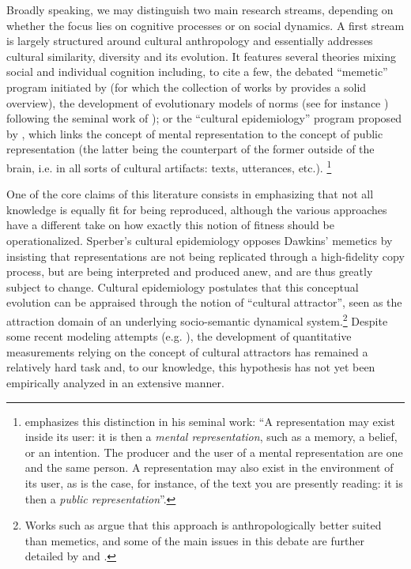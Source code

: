 Broadly speaking, we may distinguish two main research streams, depending on whether the focus lies on cognitive processes or on social dynamics. A first stream is largely structured around cultural anthropology and essentially addresses cultural similarity, diversity and its evolution. It features several theories mixing social and individual cognition including, to cite a few, the debated ``memetic'' program initiated by \citet{Dawkins76} (for which the collection of works by \citet{Aunger00} provides a solid overview), the development of evolutionary models of norms (see for instance \citet{Ehrlich05}) following the seminal work of \citet{Boyd85}); or the ``cultural epidemiology'' program proposed by \citet{sper:expl}, which links the concept of mental representation to the concept of public representation (the latter being the counterpart of the former outside of the brain, \hbox{i.e.} in all sorts of cultural artifacts: texts, utterances, etc.).
\footnote{\citet{sper:expl} emphasizes this distinction in his seminal work: ``A representation may exist inside its user: it is then a \emph{mental representation}, such as a memory, a belief, or an intention. The producer and the user of a mental representation are one and the same person. A representation may also exist in the environment of its user, as is the case, for instance, of the text you are presently reading: it is then a \emph{public representation}''.}

One of the core claims of this literature consists in emphasizing that not all knowledge is equally fit for being reproduced, although the various approaches have a different take on how exactly this notion of fitness should be operationalized. Sperber's cultural epidemiology opposes Dawkins' memetics by insisting that representations are not being replicated through a high-fidelity copy process, but are being interpreted and produced anew, and are thus greatly subject to change.
Cultural epidemiology postulates that this conceptual evolution can be appraised through the notion of ``cultural attractor'', seen as the attraction domain of an underlying socio-semantic dynamical system.\footnote{Works such as \citet{Atran03} argue that this approach is anthropologically better suited than memetics, and some of the main issues in this debate are further detailed by \citet{Kuper00} and \citet{Bloch00}.}
Despite some recent modeling attempts (\hbox{e.g.} \citet{Claidiere07}), the development of quantitative measurements relying on the concept of cultural attractors has remained a relatively hard task and, to our knowledge, this hypothesis has not yet been empirically analyzed in an extensive manner.



